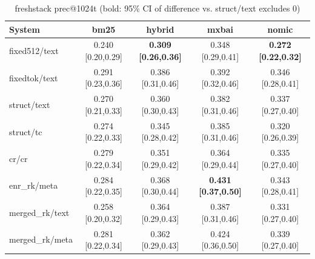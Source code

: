 \begin{table}[t]
\centering\small
\caption{freshstack prec@1024t (bold: 95\% CI of difference vs. struct/text excludes 0)}
\label{tab:freshstack}
\begin{tabular}{lcccc}
\toprule
System & bm25 & hybrid & mxbai & nomic \\
\midrule
fixed512/text & 0.240 {\scriptsize[0.20,0.29]} & \textbf{0.309 {\scriptsize[0.26,0.36]}} & 0.348 {\scriptsize[0.29,0.41]} & \textbf{0.272 {\scriptsize[0.22,0.32]}} \\
fixedtok/text & 0.291 {\scriptsize[0.23,0.36]} & 0.386 {\scriptsize[0.31,0.46]} & 0.392 {\scriptsize[0.32,0.46]} & 0.346 {\scriptsize[0.28,0.41]} \\
struct/text & 0.270 {\scriptsize[0.21,0.33]} & 0.360 {\scriptsize[0.30,0.43]} & 0.382 {\scriptsize[0.31,0.46]} & 0.337 {\scriptsize[0.27,0.40]} \\
struct/tc & 0.274 {\scriptsize[0.22,0.33]} & 0.345 {\scriptsize[0.28,0.42]} & 0.385 {\scriptsize[0.31,0.46]} & 0.320 {\scriptsize[0.26,0.39]} \\
cr/cr & 0.279 {\scriptsize[0.22,0.34]} & 0.351 {\scriptsize[0.29,0.42]} & 0.364 {\scriptsize[0.29,0.44]} & 0.335 {\scriptsize[0.27,0.40]} \\
enr\_rk/meta & 0.284 {\scriptsize[0.22,0.35]} & 0.368 {\scriptsize[0.30,0.44]} & \textbf{0.431 {\scriptsize[0.37,0.50]}} & 0.343 {\scriptsize[0.28,0.41]} \\
merged\_rk/text & 0.258 {\scriptsize[0.20,0.32]} & 0.364 {\scriptsize[0.29,0.43]} & 0.387 {\scriptsize[0.31,0.46]} & 0.331 {\scriptsize[0.27,0.40]} \\
merged\_rk/meta & 0.281 {\scriptsize[0.22,0.34]} & 0.362 {\scriptsize[0.29,0.43]} & 0.424 {\scriptsize[0.36,0.50]} & 0.339 {\scriptsize[0.27,0.40]} \\
\bottomrule
\end{tabular}
\end{table}